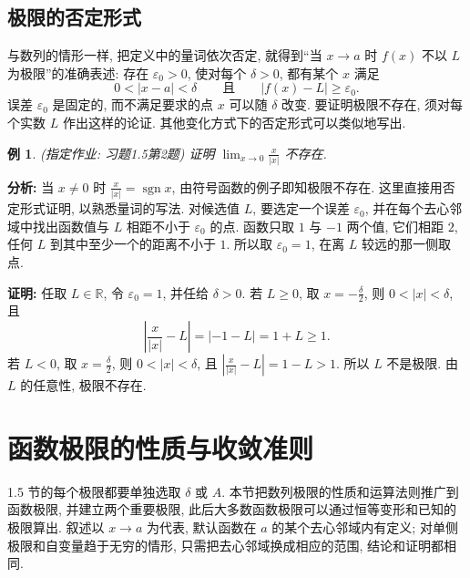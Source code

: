 \documentclass[UTF8,openany]{ctexbook}
\theoremstyle{chinesetextbook}
\newtheorem{example}{例}[section]
\newenvironment{cnproof}{\par\indent\textbf{证明:} \ignorespaces}{\par}
\begin{document}
\subsection{极限的否定形式}
与数列的情形一样, 把定义中的量词依次否定, 就得到“当 $x\to a$ 时 $f(x)$ 不以 $L$ 为极限”的准确表述: 存在 $\varepsilon_0>0$, 使对每个 $\delta>0$, 都有某个 $x$ 满足
\[
0<|x-a|<\delta\qquad\text{且}\qquad|f(x)-L|\ge\varepsilon_0.
\]
误差 $\varepsilon_0$ 是固定的, 而不满足要求的点 $x$ 可以随 $\delta$ 改变. 要证明极限不存在, 须对每个实数 $L$ 作出这样的论证. 其他变化方式下的否定形式可以类似地写出.
\begin{example}
\textnormal{(指定作业: 习题1.5第2题)} 证明 $\displaystyle\lim_{x\to0}\frac x{|x|}$ 不存在.
\end{example}
\par\indent\textbf{分析:} 当 $x\ne0$ 时 $\displaystyle\frac x{|x|}=\operatorname{sgn}x$, 由符号函数的例子即知极限不存在. 这里直接用否定形式证明, 以熟悉量词的写法. 对候选值 $L$, 要选定一个误差 $\varepsilon_0$, 并在每个去心邻域中找出函数值与 $L$ 相距不小于 $\varepsilon_0$ 的点. 函数只取 $1$ 与 $-1$ 两个值, 它们相距 $2$, 任何 $L$ 到其中至少一个的距离不小于 $1$. 所以取 $\varepsilon_0=1$, 在离 $L$ 较远的那一侧取点.
\begin{cnproof}
任取 $L\in\mathbb R$, 令 $\varepsilon_0=1$, 并任给 $\delta>0$. 若 $L\ge0$, 取 $\displaystyle x=-\frac\delta2$, 则 $0<|x|<\delta$, 且
\[
\left|\frac x{|x|}-L\right|=|-1-L|=1+L\ge1.
\]
若 $L<0$, 取 $\displaystyle x=\frac\delta2$, 则 $0<|x|<\delta$, 且 $\displaystyle\left|\frac x{|x|}-L\right|=1-L>1$. 所以 $L$ 不是极限. 由 $L$ 的任意性, 极限不存在.
\end{cnproof}
\section{函数极限的性质与收敛准则}
1.5 节的每个极限都要单独选取 $\delta$ 或 $A$. 本节把数列极限的性质和运算法则推广到函数极限, 并建立两个重要极限, 此后大多数函数极限可以通过恒等变形和已知的极限算出. 叙述以 $x\to a$ 为代表, 默认函数在 $a$ 的某个去心邻域内有定义; 对单侧极限和自变量趋于无穷的情形, 只需把去心邻域换成相应的范围, 结论和证明都相同.
\end{document}
